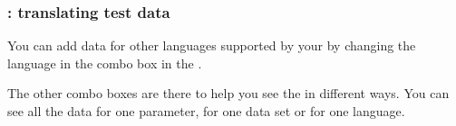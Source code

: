 \subsubsection{\gddatasetsview{}: translating test data}
\label{TasksDSVTranslate}

You can add data for other languages supported by your \gdaut{} by changing the language in the combo box in the \gddatasetsview{}. 



The other combo boxes are there to help you see the \gddatasetsview{} in different ways. You can see all the data for one parameter, for one data set or for one language. 



